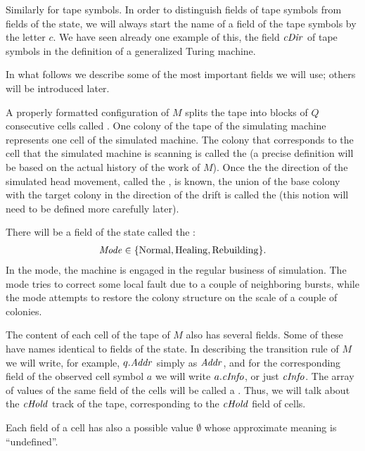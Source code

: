 \documentclass[12pt]{memoir}
\newcommand{\fld}[1]{\ensuremath{\textit{#1\/}}}
\newcommand{\Addr}{\fld{Addr}}
\newcommand{\cDir}{\fld{cDir}}
\newcommand{\cHold}{\fld{cHold}}
\newcommand{\cInfo}{\fld{cInfo}}
\newcommand{\Mode}{\fld{Mode}}
\newcommand{\Rebuilding}{\mathrm{Rebuilding}}
\newcommand{\Normal}{\mathrm{Normal}}
\newcommand{\Healing}{\mathrm{Healing}}
\begin{document}
Similarly for tape symbols.
In order to distinguish fields of tape symbols from fields of the state,
we will always start the name of a field of the tape symbols by the letter \( c \).
We have seen already one example of this, the field \( \cDir \) of tape symbols
in the definition of a generalized Turing machine.

In what follows we describe some of the most important fields we will use;
others will be introduced later.

A properly formatted configuration of \( M \) splits the tape into blocks of \( Q \)
consecutive cells called .
One colony of the tape of the simulating
machine represents one cell of the simulated machine.
The colony that corresponds to the cell that the
simulated machine is scanning is called the 
(a precise definition will be based on the actual history of the work of \( M \)).
Once the the direction of the simulated head movement, called the
, is known, the union of the base colony with the target colony in
the direction of the drift is called the  (this notion will 
need to be defined more carefully later).

There will be a field of the state called the :
 \begin{align*}
   \Mode\in\{ \Normal,\Healing, \Rebuilding \}.
 \end{align*}
In the  mode, the machine is engaged 
in the regular business of simulation.
The  mode tries to correct some local fault due to a couple of neighboring
bursts, while the  mode attempts to restore the colony structure
on the scale of a couple of colonies.

The content of each cell of the tape of \( M \) also has several fields.
Some of these have names identical to fields of the state.
In describing the transition rule of \( M \) we will write, for example,
\( q.\Addr \) simply as \( \Addr \), and for the corresponding field of the
observed cell symbol \( a \) we will write \( a.\cInfo \), or just \( \cInfo \).
The array of values of the same field of the cells will be called a .
Thus, we will talk about the \( \cHold \) track of the tape, corresponding to the
\( \cHold \) field of cells.

Each field of a cell has also a possible value
\( \emptyset \) whose approximate meaning is ``undefined''.
\end{document}
